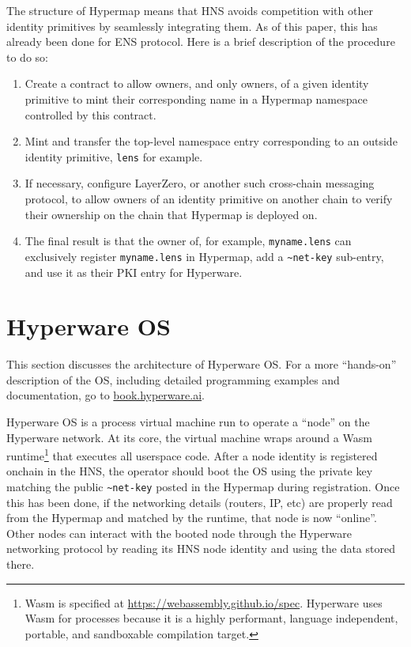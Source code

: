 \documentclass[runningheads]{llncs}
\begin{document}
The structure of Hypermap means that HNS avoids competition with other identity primitives by seamlessly integrating them.
As of this paper, this has already been done for ENS protocol.
Here is a brief description of the procedure to do so:
\begin{enumerate}
    \item Create a contract to allow owners, and only owners, of a given identity primitive to mint their corresponding name in a Hypermap namespace controlled by this contract.
    \item Mint and transfer the top-level namespace entry corresponding to an outside identity primitive, \verb|lens| for example.
    \item If necessary, configure LayerZero, or another such cross-chain messaging protocol, to allow owners of an identity primitive on another chain to verify their ownership on the chain that Hypermap is deployed on.
    \item The final result is that the owner of, for example, \verb|myname.lens| can exclusively register \verb|myname.lens| in Hypermap, add a \verb|~net-key| sub-entry, and use it as their PKI entry for Hyperware.
\end{enumerate}

\section{Hyperware OS}
\label{sec:os}

This section discusses the architecture of Hyperware OS.
For a more ``hands-on'' description of the OS, including detailed programming examples and documentation, go to \href{https://book.hyperware.ai}{book.hyperware.ai}.

Hyperware OS is a process virtual machine run to operate a ``node'' on the Hyperware network.
At its core, the virtual machine wraps around a Wasm runtime\footnote{Wasm is specified at \url{https://webassembly.github.io/spec}.
Hyperware uses Wasm for processes because it is a highly performant, language independent, portable, and sandboxable compilation target.}
that executes all userspace code.
After a node identity is registered onchain in the HNS, the operator should boot the OS using the private key matching the public \verb|~net-key| posted in the Hypermap during registration.
Once this has been done, if the networking details (routers, IP, etc) are properly read from the Hypermap and matched by the runtime, that node is now ``online''.
Other nodes can interact with the booted node through the Hyperware networking protocol by reading its HNS node identity and using the data stored there.
\end{document}
